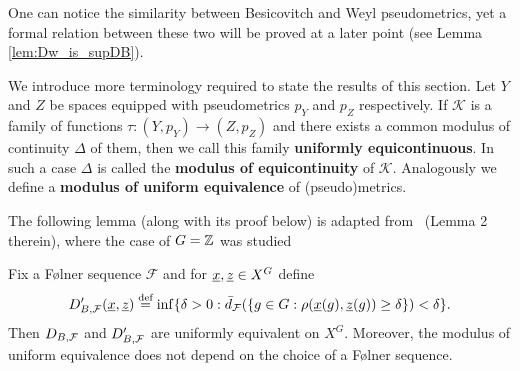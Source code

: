 \noindent
One can notice the similarity between Besicovitch and Weyl pseudometrics, yet a formal relation between these two will be proved at a later point (see Lemma \ref{lem:Dw_is_supDB}).

We introduce more terminology required to state the results of this section.
%
Let $Y$ and $Z$ be spaces equipped with pseudometrics $p_Y$ and $p_Z$ respectively.
%
If  $\mathcal{K}$ is a family of functions $\tau:(Y,p_Y)\to(Z,p_Z)$ and there exists a common modulus of continuity $\Delta$ of them, then we call this family {\bf uniformly equicontinuous}. 
%
In such a case $\Delta$ is called the {\bf modulus of equicontinuity} of $\mathcal{K}$.
%
Analogously we define a {\bf modulus of uniform equivalence} of (pseudo)metrics.


The following lemma (along with its proof below) is adapted from~\cite{KLO16} (Lemma 2 therein), where the case of $G=\mathbb{Z}$ was studied
\begin{lem}\label{lem:db-prim}
Fix a F{\o}lner sequence $\mathcal F$ and for $\underline{x},\underline{z}\in X^{G}$ define
\begin{equation}\label{eq:DBFprim-def}
D'_{B,\mathcal F}(\underline{x},\underline{z})\stackrel{\textup{def}}{=}\inf
\{\delta>0: \bar{d}_{\mathcal F}(\{g\in G: \rho(\underline{x}(g),\underline{z}(g))\ge \delta\})<\delta\}.
\end{equation}
Then $D_{B,\operatorname{\mathcal{F}}}$ and $D_{B,\operatorname{\mathcal{F}}}'$ are uniformly equivalent on $X^G$. Moreover, the modulus of uniform equivalence does not depend on the choice of a F{\o}lner sequence. 
\end{lem}

